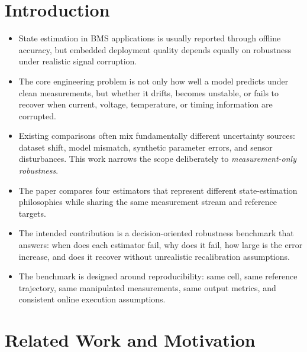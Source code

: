 \documentclass[review]{elsarticle}
\begin{document}
\section{Introduction}
\begin{itemize}[leftmargin=*]
    \item State estimation in BMS applications is usually reported through offline accuracy, but embedded deployment quality depends equally on robustness under realistic signal corruption.
    \item The core engineering problem is not only how well a model predicts under clean measurements, but whether it drifts, becomes unstable, or fails to recover when current, voltage, temperature, or timing information are corrupted.
    \item Existing comparisons often mix fundamentally different uncertainty sources: dataset shift, model mismatch, synthetic parameter errors, and sensor disturbances. This work narrows the scope deliberately to \emph{measurement-only robustness}.
    \item The paper compares four estimators that represent different state-estimation philosophies while sharing the same measurement stream and reference targets.
    \item The intended contribution is a decision-oriented robustness benchmark that answers: when does each estimator fail, why does it fail, how large is the error increase, and does it recover without unrealistic recalibration assumptions.
    \item The benchmark is designed around reproducibility: same cell, same reference trajectory, same manipulated measurements, same output metrics, and consistent online execution assumptions.
\end{itemize}

\section{Related Work and Motivation}
\end{document}
